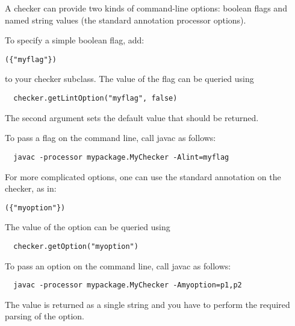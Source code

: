 
A checker can provide two kinds of command-line options:
boolean flags and
named string values (the standard annotation processor
options).


To specify a simple boolean flag, add:

\begin{alltt}
  (\{"myflag"\})
\end{alltt}

\noindent
to your checker subclass.
The value of the flag can be queried using

\begin{Verbatim}
  checker.getLintOption("myflag", false)
\end{Verbatim}

The second argument sets the default value that should be returned.

To pass a flag on the command line, call javac as follows:

\begin{Verbatim}
  javac -processor mypackage.MyChecker -Alint=myflag
\end{Verbatim}



For more complicated options, one can use the standard
 annotation on the checker, as in:

\begin{alltt}
  (\{"myoption"\})
\end{alltt}

The value of the option can be queried using

\begin{Verbatim}
  checker.getOption("myoption")
\end{Verbatim}

To pass an option on the command line, call javac as follows:

\begin{Verbatim}
  javac -processor mypackage.MyChecker -Amyoption=p1,p2
\end{Verbatim}

The value is returned as a single string and you have to perform the
required parsing of the option.


